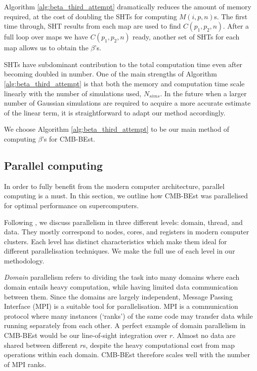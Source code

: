 Algorithm \ref{alg:beta_third_attempt} dramatically reduces the amount of memory required, at the cost of doubling the SHTs for computing $M(i,p,n)$s. The first time through, SHT results from each map are used to find $C(p_1,p_2,n)$. After a full loop over maps we have $C(p_1,p_2,n)$ ready, another set of SHTs for each map allows us to obtain the $\beta$'s.

SHTs have subdominant contribution to the total computation time even after becoming doubled in number. One of the main strengths of Algorithm \ref{alg:beta_third_attempt} is that both the memory and computation time scale linearly with the number of simulations used, $N_{sims}$. In the future when a larger number of Gaussian simulations are required to acquire a more accurate estimate of the linear term, it is straightforward to adapt our method accordingly.

We choose Algorithm \ref{alg:beta_third_attempt} to be our main method of computing $\beta$'s for CMB-BEst.

\subsection{Parallel computing}


In order to fully benefit from the modern computer architecture, parallel computing is a must. In this section, we outline how CMB-BEst was parallelised for optimal performance on supercomputers.

Following \cite{Jeffers2016intel}, we discuss parallelism in three different levels: domain, thread, and data. They mostly correspond to nodes, cores, and registers in modern computer clusters. Each level has distinct characteristics which make them ideal for different parallelisation techniques. We make the full use of each level in our methodology.

\textit{Domain} parallelism refers to dividing the task into many domains where each domain entails heavy computation, while having limited data communication between them. Since the domains are largely independent, Message Passing Interface (MPI) is a suitable tool for parallelisation. MPI is a communication protocol where many instances (`ranks') of the same code may transfer data while running separately from each other. A perfect example of domain parallelism in CMB-BEst would be our line-of-sight integration over $r$. Almost no data are shared between different $r$s, despite the heavy computational cost from map operations within each domain. CMB-BEst therefore scales well with the number of MPI ranks.

